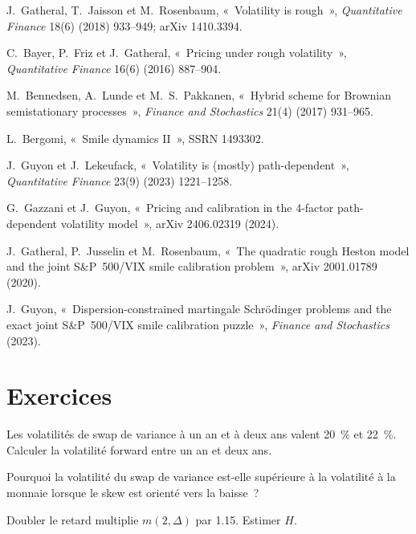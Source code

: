 \begin{omsources}
\item J.~Gatheral, T.~Jaisson et M.~Rosenbaum, «~Volatility is rough~», \emph{Quantitative Finance} 18(6) (2018)
933--949; arXiv 1410.3394.
\item C.~Bayer, P.~Friz et J.~Gatheral, «~Pricing under rough volatility~», \emph{Quantitative Finance} 16(6)
(2016) 887--904.
\item M.~Bennedsen, A.~Lunde et M.~S.~Pakkanen, «~Hybrid scheme for Brownian semistationary processes~»,
\emph{Finance and Stochastics} 21(4) (2017) 931--965.
\item L.~Bergomi, «~Smile dynamics II~», SSRN 1493302.
\item J.~Guyon et J.~Lekeufack, «~Volatility is (mostly) path-dependent~», \emph{Quantitative Finance} 23(9)
(2023) 1221--1258.
\item G.~Gazzani et J.~Guyon, «~Pricing and calibration in the 4-factor path-dependent volatility model~»,
arXiv 2406.02319 (2024).
\item J.~Gatheral, P.~Jusselin et M.~Rosenbaum, «~The quadratic rough Heston model and the joint S\&P~500/VIX
smile calibration problem~», arXiv 2001.01789 (2020).
\item J.~Guyon, «~Dispersion-constrained martingale Schrödinger problems and the exact joint S\&P~500/VIX smile
calibration puzzle~», \emph{Finance and Stochastics} (2023).
\end{omsources}

\section{Exercices}

\begin{exercise}[$\star$]\label{exo:dv:rough-volatility-and-forward-variance-models:1}
Les volatilités de swap de variance à un an et à deux ans valent 20~\% et 22~\%. Calculer la volatilité forward entre
un an et deux ans.
\end{exercise}

\begin{exercise}[$\star$]\label{exo:dv:rough-volatility-and-forward-variance-models:2}
Pourquoi la volatilité du swap de variance est-elle supérieure à la volatilité à la monnaie lorsque le skew est orienté vers la baisse~?
\end{exercise}

\begin{exercise}[$\star$]\label{exo:dv:rough-volatility-and-forward-variance-models:3}
Doubler le retard multiplie $m(2,\Delta)$ par 1.15. Estimer $H$.
\end{exercise}

